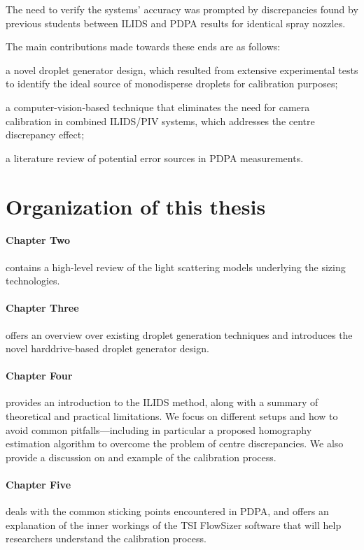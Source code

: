 \documentclass[11.5pt,oneside]{book}
\begin{document}
The need to verify the systems' accuracy was prompted by discrepancies found by
previous students between ILIDS and PDPA results for identical spray nozzles.

The main contributions made towards these ends are as follows:
\begin{alist}
\item a novel droplet generator design, which resulted from extensive
        experimental tests to identify the ideal source of monodisperse droplets
        for calibration purposes;
\item a computer-vision-based technique that eliminates the need for camera
        calibration in combined ILIDS/PIV systems, which addresses the centre
        discrepancy effect;
\item a literature review of potential error sources in PDPA
        measurements.
\end{alist}

\section{Organization of this thesis}
\paragraph{Chapter Two} contains a high-level review of the light scattering models
underlying the sizing technologies.

\paragraph{Chapter Three} offers an overview over
existing droplet generation techniques and introduces the novel harddrive-based
droplet generator design.

\paragraph{Chapter Four} provides an introduction to the ILIDS
method, along with a summary of theoretical and practical limitations. We focus
on different setups and how to avoid common pitfalls—including in
particular a proposed homography estimation algorithm to overcome the problem of
centre discrepancies. We also provide a discussion on and example of the
calibration process.

\paragraph{Chapter Five} deals with the common sticking points
encountered in PDPA, and offers an explanation of the inner workings of the TSI
FlowSizer software that will help researchers understand the calibration
process.
\end{document}
